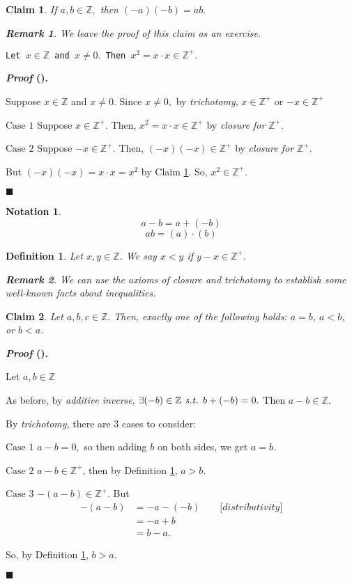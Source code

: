 \documentclass[12pt,a4paper]{article}
\newtheorem{nota}{Notation}[section]
\newtheorem{df}{Definition}[subsection]
\newtheorem{clm}{Claim}[subsection]
\newcounter{nprf}[subsection]
\newtheorem*{rmk}{\indent Remark}
\newenvironment*{prf}{\par\indent\textbf{\textit{Proof} (\stepcounter{nprf}\thenprf). }\par }{\par\hfill $\blacksquare$\par}
\def\Z{{\mathbb{Z}}}
\def\Zp{{\Z^{+}}}
\def\st{\emph{ s.t. }}
\begin{document}
\begin{clm}\label{clm5.1.4}
	If $a,b\in\Z,$ then $(-a)(-b)=ab.$	
	\begin{rmk} We leave the proof of this claim as an exercise. \end{rmk}
\end{clm}
\begin{framed}
\noindent\texttt{Let $x\in\Z$ and $x\neq0.$ Then $x^2=x\cdot x\in\Zp.$} \label{Problem1}
\begin{prf}
	Suppose $x\in\Z$ and $x\neq0$. Since $x\neq0,$ by \textit{trichotomy}, $x\in\Zp$ or $-x\in\Zp$\par$\boxed{\text{Case }1}$ Suppose $x\in\Zp.$ Then, $x^2=x\cdot x\in\Zp$ by \textit{closure for $\Zp$}.\par$\boxed{\text{Case }2}$ Suppose $-x\in\Zp.$ Then, $(-x)(-x)\in\Zp$ by \textit{closure for $\Zp$}.\par\hspace{5mm}But $(-x)(-x)=x\cdot x=x^2$ by Claim \ref{clm5.1.4}. So, $x^2\in\Zp.$
\end{prf}	
\end{framed}
\begin{nota}
	\[a-b=a+(-b)\]\[ab=(a)\cdot(b)\]
\end{nota}
\begin{df}\label{df5.1.2}
	Let $x,y\in\Z$. We say $x<y$ if $y-x\in\Zp.$
	\begin{rmk} We can use the axioms of closure and trichotomy to establish some well-known facts about inequalities. \end{rmk}
\end{df}
\begin{framed}
\begin{clm}
	Let $a,b,c\in\Z.$ Then, exactly one of the following holds: $a=b$, $a<b$, or $b<a$.
\end{clm}
	\begin{prf}
		Let $a,b\in\Z$\par As before, by \textit{additive inverse}, $\exists(-b)\in\Z\st b+(-b)=0.$ Then $a-b\in\Z.$\par By \textit{trichotomy}, there are 3 cases to consider:\par$\boxed{\text{Case }1}$ $a-b=0,$ so then adding $b$ on both sides, we get $a=b.$\par $\boxed{\text{Case }2}$ $a-b\in\Zp$, then by Definition \ref{df5.1.2}, $a>b$.\par $\boxed{\text{Case }3}$ $-(a-b)\in\Zp.$ But \[\begin{aligned}-(a-b)&=-a-(-b)\qquad\big[\textit{distributivity}\big]\\&=-a+b\\&=b-a.\end{aligned}\]\par\hspace{5mm}So, by Definition \ref{df5.1.2}, $b>a.$
	\end{prf}
\end{framed}
\end{document}
